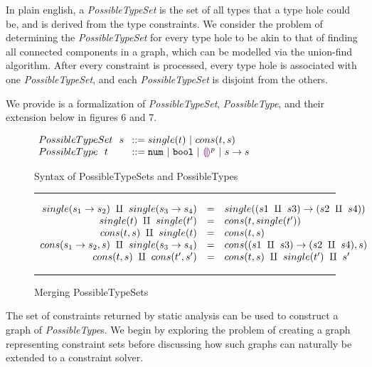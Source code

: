In plain english, a \textit{PossibleTypeSet} is the set of all types that a type hole could be, and is derived from the type constraints. We consider the problem of determining the \textit{PossibleTypeSet} for every type hole to be akin to that of finding all connected components in a graph, which can be modelled via the union-find algorithm. After every constraint is processed, every type hole is associated with one \textit{PossibleTypeSet}, and each \textit{PossibleTypeSet} is disjoint from the others.

We provide is a formalization of \textit{PossibleTypeSet}, \textit{PossibleType}, and their extension below in figures 6 and 7.

\begin{figure}[htbp]
\centering
\vspace{-3px} 
$\arraycolsep=4pt\begin{array}{lll}
PossibleTypeSet~~ s & ::= 
single(t) ~\vert~ 
cons(t, s)
\\
PossibleType~~ t & ::= 
  \tnum ~\vert~
  \tbool ~\vert~
  \ehole^p ~\vert~
  \tarr{s}{s}
  \\
\end{array}$
\caption{Syntax of PossibleTypeSets and PossibleTypes}
\vspace{5px} 
\hrule
\[\begin{array}{rcl}
    single(s_1 \rightarrow s_2) ~\amalg~ single(s_3 \rightarrow s_4) & = & single({(s1 ~\amalg~ s3) \rightarrow (s2 ~\amalg~ s4)}) \\
    single(t) ~\amalg~ single(t') & = & cons(t, single(t')) \\
    cons(t,s) ~\amalg~ single(t) & = & cons(t, s) \\
    cons(s_1 \rightarrow s_2, s) ~\amalg~ single(s_3 \rightarrow s_4) & = & cons((s1 ~\amalg~ s3) \rightarrow (s2 ~\amalg~ s4) , s) \\
    cons(t,s) ~\amalg~ cons(t',s') & = & cons(t,s) ~\amalg~ single(t') ~\amalg~ s' \\
\end{array}\] 
\caption{Merging PossibleTypeSets}
\vspace{5px} 
\hrule
\label{fig:syntax_fig}
\vspace{-5px}
\end{figure}

 The set of constraints returned by static analysis can be used to construct a graph of \textit{PossibleType}s. We begin by exploring the problem of creating a graph representing constraint sets before discussing how such graphs can naturally be extended to a constraint solver. 
 
